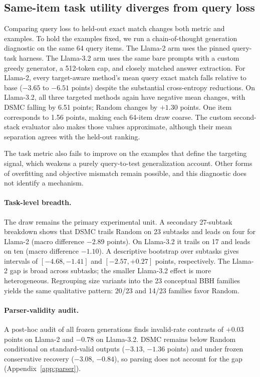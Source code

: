 \documentclass{article}
\newcommand{\method}{\textsc{DSMC}}
\begin{document}
\subsection{Same-item task utility diverges from query loss}

Comparing query loss to held-out exact match changes both metric and examples.
To hold the examples fixed, we run a chain-of-thought generation diagnostic on
the same 64 query items. The Llama-2 arm uses the pinned query-task harness.
The Llama-3.2 arm uses the same bare prompts with a custom greedy generator, a
512-token cap, and closely matched answer extraction. For Llama-2, every
target-aware method's mean query exact match falls relative to base
($-3.65$ to $-6.51$ points) despite the substantial cross-entropy reductions.
On Llama-3.2, all three targeted methods again have negative mean changes, with
\method{} falling by 6.51 points; Random changes by $+1.30$ points. One item
corresponds to 1.56 points, making each 64-item draw coarse. The custom
second-stack evaluator also makes those values approximate, although their mean
separation agrees with the held-out ranking.

The task metric also fails to improve on the examples that define the
targeting signal, which weakens a purely query-to-test generalization account.
Other forms of overfitting and objective mismatch remain possible, and this
diagnostic does not identify a mechanism.

\paragraph{Task-level breadth.}
The draw remains the primary experimental unit. A secondary 27-subtask
breakdown shows that \method{} trails Random on 23 subtasks and leads on four
for Llama-2 (macro difference $-2.89$ points). On Llama-3.2 it trails on 17
and leads on ten (macro difference $-1.10$). A descriptive bootstrap over
subtasks gives intervals of $[-4.68,-1.41]$ and $[-2.57,+0.27]$ points,
respectively. The Llama-2 gap is broad across subtasks; the smaller Llama-3.2
effect is more heterogeneous. Regrouping size variants into the 23 conceptual
BBH families yields the same qualitative pattern: 20/23 and 14/23 families
favor Random.

\paragraph{Parser-validity audit.}
A post-hoc audit of all frozen generations finds invalid-rate contrasts of
$+0.03$ points on Llama-2 and $-0.78$ on Llama-3.2. \method{} remains below
Random conditional on standard-valid outputs ($-3.13$, $-1.36$ points) and
under frozen conservative recovery ($-3.08$, $-0.84$), so parsing does not
account for the gap (Appendix~\ref{app:parser}).
\end{document}
